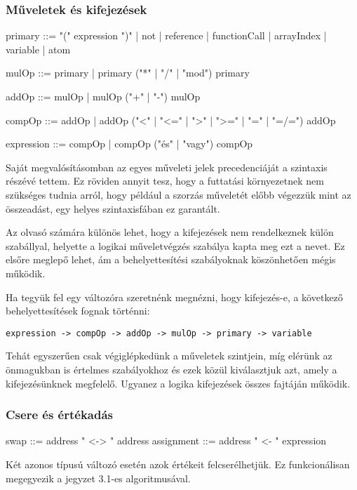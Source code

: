 \subsubsection{Műveletek és kifejezések}
\label{sec:expressions}

\begin{ebnf}
primary ::= "(" expression ")" 
    | not 
    | reference 
    | functionCall 
    | arrayIndex 
    | variable 
    | atom

mulOp ::= primary 
    | primary ("*" | "/" | "mod") primary

addOp ::= mulOp 
    | mulOp ("+" | "-") mulOp

compOp ::= addOp 
    | addOp ("<" | "<=" | ">" | ">=" | "=" | "=/=") addOp

expression ::= compOp 
    | compOp ("és" | "vagy") compOp
\end{ebnf}

Saját megvalósításomban az egyes műveleti jelek precedenciáját a szintaxis részévé tettem. Ez röviden annyit tesz, hogy a futtatási környezetnek nem szükséges tudnia arról, hogy például a szorzás műveletét előbb végezzük mint az összeadást, egy helyes szintaxisfában ez garantált.

Az olvasó számára különös lehet, hogy a kifejezések nem rendelkeznek külön szabállyal, helyette a logikai műveletvégzés szabálya kapta meg ezt a nevet. Ez elsőre meglepő lehet, ám a behelyettesítési szabályoknak köszönhetően mégis működik.

Ha tegyük fel egy változóra szeretnénk megnézni, hogy kifejezés-e, a következő behelyettesítések fognak történni:

{\small \texttt{expression -> compOp -> addOp -> mulOp -> primary -> variable}\par}

Tehát egyszerűen csak végiglépkedünk a műveletek szintjein, míg elérünk az önmagukban is értelmes szabályokhoz és ezek közül kiválasztjuk azt, amely a kifejezésünknek megfelelő. Ugyanez a logika kifejezések összes fajtáján működik.

\subsubsection{Csere és értékadás}

\begin{ebnf}
swap ::= address " <-> " address
assignment ::= address " <- " expression
\end{ebnf}

Két azonos típusú változó esetén azok értékeit felcserélhetjük. Ez funkcionálisan megegyezik a jegyzet 3.1-es algoritmusával.


